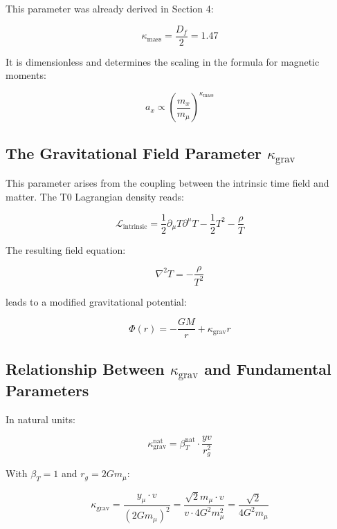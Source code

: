 \documentclass[12pt,a4paper]{article}
\begin{document}
	This parameter was already derived in Section 4:
	
	\begin{equation}
		\kappa_{\text{mass}} = \frac{D_f}{2} = 1.47
	\end{equation}
	
	It is dimensionless and determines the scaling in the formula for magnetic moments:
	
	\begin{equation}
		a_x \propto \left(\frac{m_x}{m_\mu}\right)^{\kappa_{\text{mass}}}
	\end{equation}
	
	\subsection{The Gravitational Field Parameter $\kappa_{\text{grav}}$}
	
	This parameter arises from the coupling between the intrinsic time field and matter. The T0 Lagrangian density reads:
	
	\begin{equation}
		\mathcal{L}_{\text{intrinsic}} = \frac{1}{2}\partial_\mu T \partial^\mu T - \frac{1}{2}T^2 - \frac{\rho}{T}
	\end{equation}
	
	The resulting field equation:
	
	\begin{equation}
		\nabla^2 T = -\frac{\rho}{T^2}
	\end{equation}
	
	leads to a modified gravitational potential:
	
	\begin{equation}
		\Phi(r) = -\frac{GM}{r} + \kappa_{\text{grav}} r
	\end{equation}
	
	\subsection{Relationship Between $\kappa_{\text{grav}}$ and Fundamental Parameters}
	
	In natural units:
	
	\begin{equation}
		\kappa_{\text{grav}}^{\text{nat}} = \beta_T^{\text{nat}} \cdot \frac{yv}{r_g^2}
	\end{equation}
	
	With $\beta_T = 1$ and $r_g = 2Gm_\mu$:
	
	\begin{equation}
		\kappa_{\text{grav}} = \frac{y_\mu \cdot v}{(2Gm_\mu)^2} = \frac{\sqrt{2} m_\mu \cdot v}{v \cdot 4G^2m_\mu^2} = \frac{\sqrt{2}}{4G^2m_\mu}
	\end{equation}
	
\end{document}
